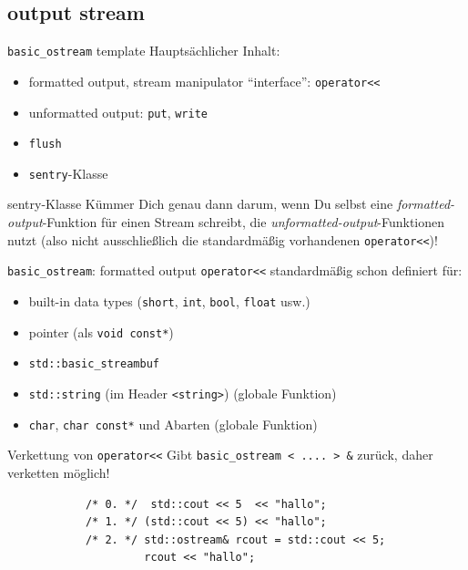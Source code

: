 \subsection{output stream}

\begin{frame}{\texttt{basic\_ostream} template}
	Hauptsächlicher Inhalt:
	\begin{itemize}
		\item formatted output, stream manipulator \enquote{interface}: \texttt{operator<<}
		\item unformatted output: \texttt{put}, \texttt{write}
		\item \texttt{flush}
		\item \texttt{sentry}-Klasse
	\end{itemize}
	
	\pause
	\vspace{2em}
	
	\begin{block}{sentry-Klasse}
		Kümmer Dich genau dann darum, wenn Du selbst eine \emph{formatted-output}-Funktion für einen Stream schreibt, die \emph{unformatted-output}-Funktionen nutzt (also nicht ausschließlich die standardmäßig vorhandenen \texttt{operator<<})!
	\end{block}
\end{frame}

\begin{frame}[fragile]{\texttt{basic\_ostream}: formatted output}
	\texttt{operator<<} standardmäßig schon definiert für:
	\begin{itemize}
		\item built-in data types (\texttt{short}, \texttt{int}, \texttt{bool}, \texttt{float} usw.)
		\item pointer (als \texttt{void const*})
		\item \texttt{std::basic\_streambuf}
		\item \texttt{std::string} (im Header \texttt{<string>}) {\tiny (globale Funktion)}
		\item \texttt{char}, \texttt{char const*} und Abarten {\tiny (globale Funktion)}
	\end{itemize}
	
	\pause
	\vspace{0.5em}
	
	\begin{block}{Verkettung von \texttt{operator<<}}
		Gibt \texttt{basic\_ostream < .... > \&} zurück, daher verketten möglich!
		\begin{lstlisting}
			/* 0. */  std::cout << 5  << "hallo";
			/* 1. */ (std::cout << 5) << "hallo";
			/* 2. */ std::ostream& rcout = std::cout << 5;
			         rcout << "hallo";
		\end{lstlisting}
	\end{block}
\end{frame}

